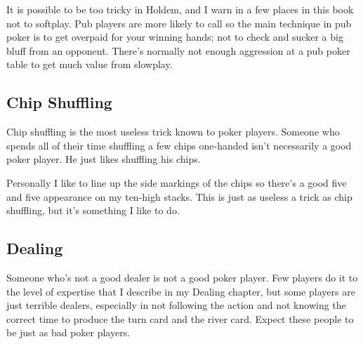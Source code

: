 It is possible to be too tricky in Holdem, and I warn in a few places
in this book not to softplay. Pub players are more likely to call so
the main technique in pub poker is to get overpaid for your winning
hands; not to check and sucker a big bluff from an opponent. There's
normally not enough aggression at a pub poker table to get much
value from slowplay.

\subsection{Chip Shuffling}

Chip shuffling is the most useless trick known to poker players.
Someone who spends all of their time shuffling a few chips one-handed
isn't necessarily a good poker player. He just likes shuffling his
chips.

Personally I like to line up the side markings of the chips so there's
a good five and five appearance on my ten-high stacks. This is just as
useless a trick as chip shuffling, but it's something I like to do.

\subsection{Dealing}

Someone who's not a good dealer is not a good poker player. Few
players do it to the level of expertise that I describe in my Dealing
chapter, but some players are just terrible dealers, especially in not
following the action and not knowing the correct time to produce the
turn card and the river card. Expect these people to be just as bad
poker players.
